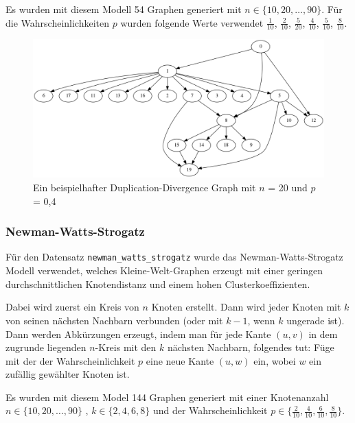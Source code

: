 \documentclass[12pt,a4paper,onecolumn,oneside,titlepage]{article}
\newcommand{\vars}{\texttt}
\begin{document}
Es wurden mit diesem Modell 54 Graphen generiert mit $n \in \{10,20, \ldots,90\}$. Für die Wahrscheinlichkeiten $p$ wurden folgende Werte verwendet $\frac{1}{10}$, $\frac{2}{10}$, $\frac{5}{20}$, $\frac{4}{10}$, $\frac{5}{10}$, $\frac{8}{10}$.
\begin{figure}
\includegraphics[scale=0.35]{dot/dot_dupdivergence.png}
\caption{Ein beispielhafter Duplication-Divergence Graph mit $n$ = 20 und $p$ = 0,4}
\label{fig:duplication-divergence}
\end{figure}

\subsubsection{Newman-Watts-Strogatz}
Für den Datensatz \vars{newman\_watts\_strogatz} wurde das Newman-Watts-Strogatz Modell verwendet\cite{Newman99}, welches Kleine-Welt-Graphen erzeugt mit einer geringen durchschnittlichen Knotendistanz und einem hohen Clusterkoeffizienten.

Dabei wird zuerst ein Kreis von $n$ Knoten erstellt. Dann wird jeder Knoten mit $k$ von seinen nächsten Nachbarn verbunden (oder mit $k-1$, wenn $k$ ungerade ist).
Dann werden Abkürzungen erzeugt, indem man für jede Kante $(u,v)$ in dem zugrunde liegenden $n$-Kreis mit den $k$ nächsten Nachbarn, folgendes tut: Füge mit der der Wahrscheinlichkeit $p$ eine neue Kante $(u,w)$ ein, wobei $w$ ein zufällig gewählter Knoten ist.

Es wurden mit diesem Model 144 Graphen generiert mit einer Knotenanzahl $n \in \{10,20, \ldots,90\}$  , $k \in \{2,4,6,8\}$ und der Wahrscheinlichkeit $p \in \{\frac{2}{10},\frac{4}{10},\frac{6}{10},\frac{8}{10}\}$.
\end{document}
